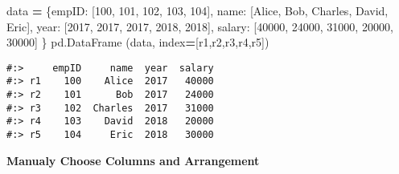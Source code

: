 \documentclass[
]{book}
\newenvironment{Shaded}{\begin{snugshade}}{\end{snugshade}}
\newcommand{\DecValTok}[1]{\textcolor[rgb]{0.06,0.06,0.06}{#1}}
\newcommand{\NormalTok}[1]{#1}
\newcommand{\OperatorTok}[1]{\textcolor[rgb]{0.43,0.43,0.43}{\textbf{#1}}}
\newcommand{\StringTok}[1]{\textcolor[rgb]{0.5,0.5,0.5}{#1}}
\begin{document}
\begin{Shaded}
\begin{Highlighting}[]
\NormalTok{data }\OperatorTok{=}\NormalTok{ \{}\StringTok{\textquotesingle{}empID\textquotesingle{}}\NormalTok{:  [}\DecValTok{100}\NormalTok{,      }\DecValTok{101}\NormalTok{,    }\DecValTok{102}\NormalTok{,      }\DecValTok{103}\NormalTok{,     }\DecValTok{104}\NormalTok{],}
        \StringTok{\textquotesingle{}name\textquotesingle{}}\NormalTok{:   [}\StringTok{\textquotesingle{}Alice\textquotesingle{}}\NormalTok{, }\StringTok{\textquotesingle{}Bob\textquotesingle{}}\NormalTok{,  }\StringTok{\textquotesingle{}Charles\textquotesingle{}}\NormalTok{, }\StringTok{\textquotesingle{}David\textquotesingle{}}\NormalTok{, }\StringTok{\textquotesingle{}Eric\textquotesingle{}}\NormalTok{],}
        \StringTok{\textquotesingle{}year\textquotesingle{}}\NormalTok{:   [}\DecValTok{2017}\NormalTok{,     }\DecValTok{2017}\NormalTok{,   }\DecValTok{2017}\NormalTok{,      }\DecValTok{2018}\NormalTok{,    }\DecValTok{2018}\NormalTok{],}
        \StringTok{\textquotesingle{}salary\textquotesingle{}}\NormalTok{: [}\DecValTok{40000}\NormalTok{,    }\DecValTok{24000}\NormalTok{,  }\DecValTok{31000}\NormalTok{,     }\DecValTok{20000}\NormalTok{,   }\DecValTok{30000}\NormalTok{] \}}
\NormalTok{pd.DataFrame (data, index}\OperatorTok{=}\NormalTok{[}\StringTok{\textquotesingle{}r1\textquotesingle{}}\NormalTok{,}\StringTok{\textquotesingle{}r2\textquotesingle{}}\NormalTok{,}\StringTok{\textquotesingle{}r3\textquotesingle{}}\NormalTok{,}\StringTok{\textquotesingle{}r4\textquotesingle{}}\NormalTok{,}\StringTok{\textquotesingle{}r5\textquotesingle{}}\NormalTok{])}
\end{Highlighting}
\end{Shaded}

\begin{verbatim}
#:>     empID     name  year  salary
#:> r1    100    Alice  2017   40000
#:> r2    101      Bob  2017   24000
#:> r3    102  Charles  2017   31000
#:> r4    103    David  2018   20000
#:> r5    104     Eric  2018   30000
\end{verbatim}

\textbf{Manualy Choose Columns and Arrangement}
\end{document}
